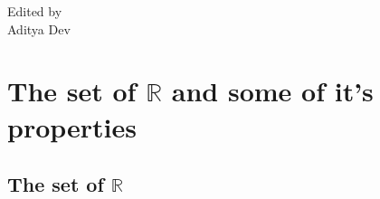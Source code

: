 \documentclass{notes}
\begin{document}
\begin{titlepage}
		\vspace{0.5\baselineskip} %
		
		
		\vfill %
		
		
		
		\vspace{0.3\baselineskip} %
		
		
		{\large Edited by\\  Aditya Dev} 
		
	\end{titlepage}
	\tableofcontents
\chapter{The set of $\mathbb{R}$ and some of it's properties}

\section{The set of $\mathbb{R}$}
\end{document}
